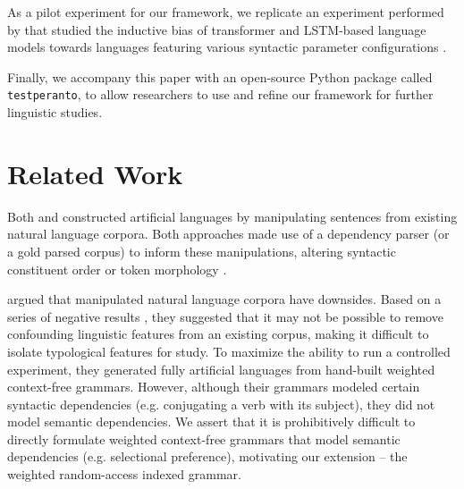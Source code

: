 \documentclass[11pt]{article}
\begin{document}
As a pilot experiment for our framework, we replicate an experiment performed by \citet{white-cotterell-2021-examining} that studied the inductive bias of transformer and LSTM-based language models towards languages featuring various syntactic parameter configurations \cite{chomsky1981principles,baker2008atoms}.

Finally, we accompany this paper with an open-source Python package called \texttt{testperanto}, to allow researchers to use and refine our framework for further linguistic studies.

\section{Related Work}


Both \citet{wang-eisner-2016-galactic} and \citet{ravfogel-etal-2019-studying} constructed artificial languages by manipulating sentences from existing natural language corpora. Both approaches made use of a dependency parser (or a gold parsed corpus) to inform these manipulations, altering syntactic constituent order \cite{wang-eisner-2016-galactic,ravfogel-etal-2019-studying} or token morphology \cite{ravfogel-etal-2019-studying}. 

\citet{white-cotterell-2021-examining} argued that manipulated natural language corpora have downsides. Based on a series of negative results \cite{cotterell-etal-2018-languages,mielke-etal-2019-kind}, they suggested that it may not be possible to remove confounding linguistic features from an existing corpus, making it difficult to isolate typological features for study. To maximize the ability to run a controlled experiment, they generated fully artificial languages from hand-built weighted context-free grammars. However, although their grammars modeled certain syntactic dependencies (e.g. conjugating a verb with its subject), they did not model semantic dependencies. We assert that it is prohibitively difficult to directly formulate weighted context-free grammars that model semantic dependencies (e.g. selectional preference), motivating our extension -- the weighted random-access indexed grammar. 

\end{document}
